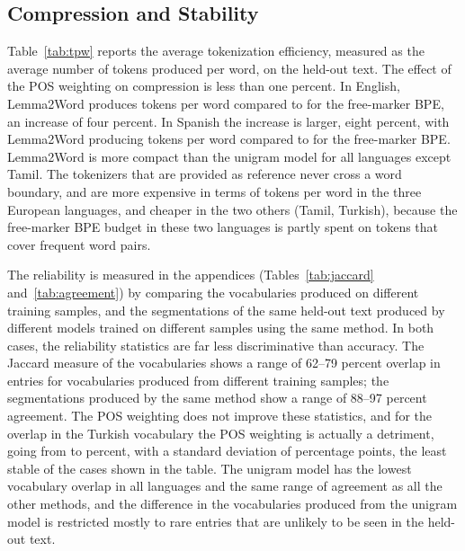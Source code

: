 \subsection{Compression and Stability}\label{sec:res-compression}
Table~\ref{tab:tpw} reports the average tokenization efficiency, measured as the average number of tokens produced per word, on the held-out text.
The effect of the POS weighting on compression is less than one percent.
In English, Lemma2Word produces \nTpwLtwEnglish{} tokens per word compared to \nTpwBpeEnglish{} for the free-marker BPE, an increase of four percent.
In Spanish the increase is larger, eight percent, with Lemma2Word producing \nTpwLtwSpanish{} tokens per word compared to \nTpwBpeSpanish{} for the free-marker BPE.
Lemma2Word is more compact than the unigram model for all languages except Tamil.
The tokenizers that are provided as reference never cross a word boundary, and are more expensive in terms of tokens per word in the three European languages, and cheaper in the two others (Tamil, Turkish), because the free-marker BPE budget in these two languages is partly spent on tokens that cover frequent word pairs.



The reliability is measured in the appendices (Tables~\ref{tab:jaccard} and~\ref{tab:agreement}) by comparing the vocabularies produced on different training samples, and the segmentations of the same held-out text produced by different models trained on different samples using the same method.
In both cases, the reliability statistics are far less discriminative than accuracy.
The Jaccard measure of the vocabularies shows a range of 62--79 percent overlap in entries for vocabularies produced from different training samples; the segmentations produced by the same method show a range of 88--97 percent agreement.
The POS weighting does not improve these statistics, and for the overlap in the Turkish vocabulary the POS weighting is actually a detriment, going from \nJacBpeTurkish{} to \nJacPosTurkish{} percent, with a standard deviation of \nJacPosTurkishSd{} percentage points, the least stable of the cases shown in the table.
The unigram model has the lowest vocabulary overlap in all languages and the same range of agreement as all the other methods, and the difference in the vocabularies produced from the unigram model is restricted mostly to rare entries that are unlikely to be seen in the held-out text.

